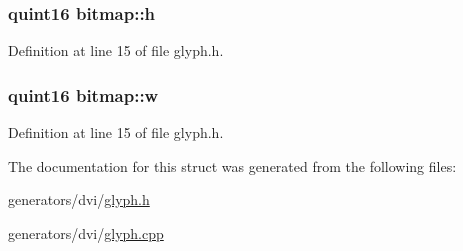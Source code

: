 \hypertarget{structbitmap_a34f28c8404007de8ede4b9a6b5e425dd}{
\subsubsection[{h}]{\setlength{\rightskip}{0pt plus 5cm}quint16 bitmap\+::h}}\label{structbitmap_a34f28c8404007de8ede4b9a6b5e425dd}


Definition at line 15 of file glyph.\+h.

\hypertarget{structbitmap_a955acbe13f247a259cbe10ced3a212fd}{
\subsubsection[{w}]{\setlength{\rightskip}{0pt plus 5cm}quint16 bitmap\+::w}}\label{structbitmap_a955acbe13f247a259cbe10ced3a212fd}


Definition at line 15 of file glyph.\+h.



The documentation for this struct was generated from the following files\+:\begin{DoxyCompactItemize}
\item 
generators/dvi/\hyperlink{glyph_8h}{glyph.\+h}\item 
generators/dvi/\hyperlink{glyph_8cpp}{glyph.\+cpp}\end{DoxyCompactItemize}
